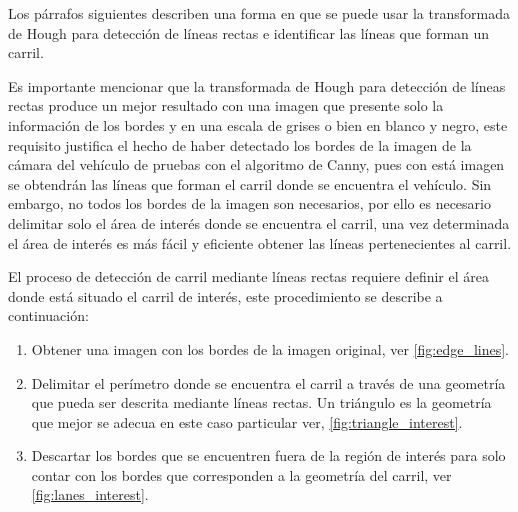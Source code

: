 Los párrafos siguientes describen una forma en que se puede usar la transformada de Hough para detección de líneas rectas e identificar las líneas que forman un carril.

Es importante mencionar que la transformada de Hough para detección de líneas rectas produce un mejor resultado con una imagen que presente solo la información de los bordes y en una escala de grises o bien en blanco y negro, este requisito justifica el hecho de haber detectado los bordes de la imagen de la cámara del vehículo de pruebas con el algoritmo de Canny, pues con está imagen se obtendrán las líneas que forman el carril donde se encuentra el vehículo. Sin embargo, no todos los bordes de la imagen son necesarios, por ello es necesario delimitar solo el área de interés donde se encuentra el carril, una vez determinada el área de interés es más fácil y eficiente obtener las líneas pertenecientes al carril.

El proceso de detección de carril mediante líneas rectas requiere definir el área donde está situado el carril de interés, este procedimiento se describe a continuación:
\begin{enumerate}
    \item Obtener una imagen con los bordes de la imagen original, ver \ref{fig:edge_lines}.
    
    \item Delimitar el perímetro donde se encuentra el carril a través de una geometría que pueda ser descrita mediante líneas rectas. Un triángulo es la geometría que mejor se adecua en este caso particular ver, \ref{fig:triangle_interest}.
    
    \item Descartar los bordes que se encuentren fuera de la región de interés para solo contar con los bordes que corresponden a la geometría del carril, ver \ref{fig:lanes_interest}.
\end{enumerate}

